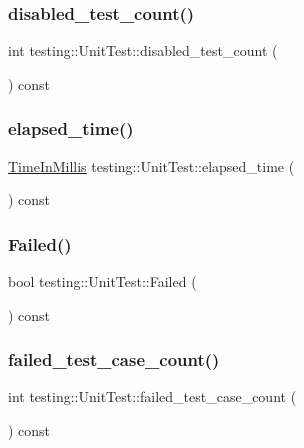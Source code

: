 \subsubsection{\texorpdfstring{disabled\+\_\+test\+\_\+count()}{disabled\_test\_count()}}
{\footnotesize\ttfamily int testing\+::\+Unit\+Test\+::disabled\+\_\+test\+\_\+count (\begin{DoxyParamCaption}{ }\end{DoxyParamCaption}) const}

\mbox{\label{classtesting_1_1UnitTest_a410e14e52f505dabe2054e5018e9ca33}} 
\subsubsection{\texorpdfstring{elapsed\+\_\+time()}{elapsed\_time()}}
{\footnotesize\ttfamily \hyperlink{namespacetesting_a992de1d091ce660f451d1e8b3ce30fd6}{Time\+In\+Millis} testing\+::\+Unit\+Test\+::elapsed\+\_\+time (\begin{DoxyParamCaption}{ }\end{DoxyParamCaption}) const}

\mbox{\label{classtesting_1_1UnitTest_a706f29e765916616b11a271a65948727}} 
\subsubsection{\texorpdfstring{Failed()}{Failed()}}
{\footnotesize\ttfamily bool testing\+::\+Unit\+Test\+::\+Failed (\begin{DoxyParamCaption}{ }\end{DoxyParamCaption}) const}

\mbox{\label{classtesting_1_1UnitTest_abc0fa297a4103f7cdd9627ae27d9d0ef}} 
\subsubsection{\texorpdfstring{failed\+\_\+test\+\_\+case\+\_\+count()}{failed\_test\_case\_count()}}
{\footnotesize\ttfamily int testing\+::\+Unit\+Test\+::failed\+\_\+test\+\_\+case\+\_\+count (\begin{DoxyParamCaption}{ }\end{DoxyParamCaption}) const}

